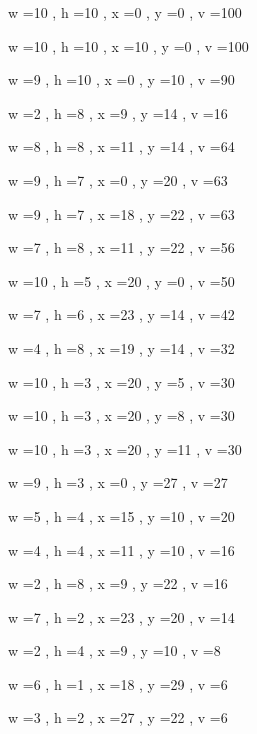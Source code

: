 \documentclass[11pt]{article}
\begin{document}
w =10 , h =10 , x =0 , y =0 , v =100
\par
w =10 , h =10 , x =10 , y =0 , v =100
\par
w =9 , h =10 , x =0 , y =10 , v =90
\par
w =2 , h =8 , x =9 , y =14 , v =16
\par
w =8 , h =8 , x =11 , y =14 , v =64
\par
w =9 , h =7 , x =0 , y =20 , v =63
\par
w =9 , h =7 , x =18 , y =22 , v =63
\par
w =7 , h =8 , x =11 , y =22 , v =56
\par
w =10 , h =5 , x =20 , y =0 , v =50
\par
w =7 , h =6 , x =23 , y =14 , v =42
\par
w =4 , h =8 , x =19 , y =14 , v =32
\par
w =10 , h =3 , x =20 , y =5 , v =30
\par
w =10 , h =3 , x =20 , y =8 , v =30
\par
w =10 , h =3 , x =20 , y =11 , v =30
\par
w =9 , h =3 , x =0 , y =27 , v =27
\par
w =5 , h =4 , x =15 , y =10 , v =20
\par
w =4 , h =4 , x =11 , y =10 , v =16
\par
w =2 , h =8 , x =9 , y =22 , v =16
\par
w =7 , h =2 , x =23 , y =20 , v =14
\par
w =2 , h =4 , x =9 , y =10 , v =8
\par
w =6 , h =1 , x =18 , y =29 , v =6
\par
w =3 , h =2 , x =27 , y =22 , v =6
\par
\newpage


\end{document}

